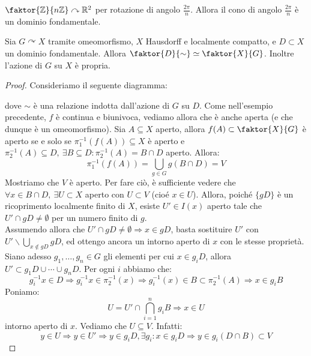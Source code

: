 \begin{ex}
$\faktor {\mathbb{Z}}{n\mathbb{Z}} \curvearrowright \mathbb{R}^2$ per rotazione di angolo $\frac{2\pi}{n}$. Allora il cono di angolo $\frac{2\pi}{n}$ è un dominio fondamentale.
\end{ex}

\begin{thm}
Sia $G \curvearrowright X$ tramite omeomorfismo, $X$ Hausdorff e localmente compatto, e $D \subset X$ un dominio fondamentale. Allora $\faktor {D}{\sim} \simeq \faktor {X}{G}$. Inoltre l'azione di $G$ su $X$ è propria.
\end{thm}
\begin{proof}
Consideriamo il seguente diagramma:
\begin{center}
\end{center}
dove $\sim$ è una relazione indotta dall'azione di $G$ su $D$. Come nell'esempio precedente, $f$ è continua e biunivoca, vediamo allora che è anche aperta (e che dunque è un omeomorfismo). Sia $A \subseteq X$ aperto, allora $f(A) \subset \faktor {X}{G}$ è aperto se e solo se $\pi _1 ^{-1} (f(A)) \subseteq X$ è aperto e $\pi _2 ^{-1} (A) \subseteq D,\ \exists B \subseteq D : \pi _2 ^{-1} (A)=B \cap D$ aperto. Allora:
$$\pi _1 ^{-1} (f(A))=\bigcup _{g \in G} g(B \cap D)=V$$
Mostriamo che $V$ è aperto. Per fare ciò, è sufficiente vedere che $\forall x \in B \cap D,\ \exists U \subset X$ aperto con $U \subset V$ (cioé $x \in U$). Allora, poiché $\{gD\}$ è un ricoprimento localmente finito di $X$, esiste $U' \in I(x)$ aperto tale che $U' \cap gD \neq \emptyset$ per un numero finito di $g$.\\
Assumendo allora che $U' \cap gD \neq \emptyset \Longrightarrow x \in gD$, basta sostituire $U'$ con $\displaystyle U' \smallsetminus \bigcup _{x \notin gD} gD$, ed ottengo ancora un intorno aperto di $x$ con le stesse proprietà. Siano adesso $g_1,\dots,g_n \in G$ gli elementi per cui $x \in g_iD$, allora $U' \subset g_1D \cup \cdots \cup g_nD$. Per ogni $i$ abbiamo che:
$$g_i^{-1}x \in D \Longrightarrow g_i^{-1}x \in \pi _2 ^{-1}(x) \Longrightarrow g_i^{-1}(x) \in B \subset \pi _2^{-1}(A) \Longrightarrow x \in g_iB$$
Poniamo:
$$U=U' \cap \bigcap _{i=1}^n g_iB \Longrightarrow  x \in U$$
intorno aperto di $x$. Vediamo che $U \subseteq V$. Infatti:
$$y \in U \Longrightarrow y \in U' \Longrightarrow y \in g_iD, \exists g_i :x \in g_iD \Longrightarrow y \in g_i(D \cap B) \subset V$$
\end{proof}